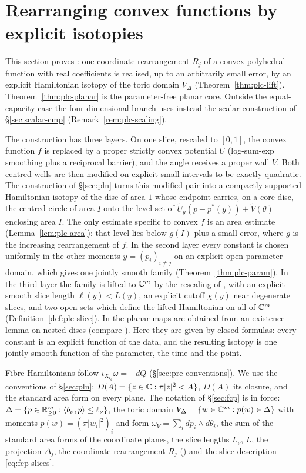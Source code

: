 \section{Rearranging convex functions by explicit isotopies}\label{sec:plc}

This section proves : one coordinate rearrangement $R_j$ of a convex
polyhedral function with real coefficients is realised, up to an arbitrarily small error, by an explicit Hamiltonian isotopy of the toric
domain $V_\Delta$ (Theorem~\ref{thm:plc-lift}). Theorem~\ref{thm:plc-planar} is the parameter-free planar core.
Outside the equal-capacity case the four-dimensional branch uses instead the scalar construction of
\S\ref{sec:scalar-cmp} (Remark~\ref{rem:plc-scaling}).

The construction has three layers. On one slice, rescaled to $[0,1]$, the convex function $f$ is replaced by a
proper strictly convex potential $U$ (log-sum-exp smoothing plus a reciprocal barrier), and the angle receives a
proper wall $V$. Both centred wells are then modified on explicit small intervals to be exactly quadratic. The construction of \S\ref{sec:pln} turns this modified pair into a compactly supported Hamiltonian
isotopy of the disc of area $1$ whose endpoint carries, on a core disc, the centred circle of area $I$ onto the level
set of $\widetilde U_y(p-p^*(y))+\widetilde V(\theta)$ enclosing area $I$. The only estimate specific to convex $f$ is an area estimate
(Lemma~\ref{lem:plc-area}): that level lies below $g(I)$ plus a small error, where $g$ is the increasing
rearrangement of $f$. In the second layer every constant is chosen uniformly in the other moments $y=(p_i)_{i\ne j}$
on an explicit open parameter domain, which gives one jointly smooth family (Theorem~\ref{thm:plc-param}). In the
third layer the family is lifted to $\mathbb{C}^m$ by the rescaling of \cite[\S2.3]{OpenAI2026}, with an explicit smooth
slice length $\ell(y)<L(y)$, an explicit cutoff $\chi(y)$ near degenerate slices, and two open sets which
define the lifted Hamiltonian on all of $\mathbb{C}^m$ (Definition~\ref{def:plc-slice}). In \cite[\S2.3]{OpenAI2026} the
planar maps are obtained from an existence lemma on nested discs (compare \cite[Lemma~3.2]{SchlenkFolding}). Here they are given by closed formulas: every
constant is an explicit function of the data, and the resulting isotopy is one jointly smooth function of the
parameter, the time and the point.

Fibre Hamiltonians follow $\iota_{X_Q}\omega=-dQ$ (\S\ref{sec:pre-conventions}). We use the conventions of
\S\ref{sec:pln}: $D(A)=\{z\in\mathbb{C}:\pi|z|^2<A\}$, $\bar D(A)$ its closure, and the standard area form on every plane.
The notation of \S\ref{sec:fcp} is in force: $\Delta=\{p\in\mathbb{R}^m_{\ge0}:\langle b_\nu,p\rangle\le\ell_\nu\}$, the toric
domain $V_\Delta=\{w\in\mathbb{C}^m:p(w)\in\Delta\}$ with moments $p(w)=(\pi|w_i|^2)_i$ and form
$\omega_V=\sum_idp_i\wedge d\theta_i$, the sum of the standard area forms of the coordinate planes, the slice lengths
$L_\nu$, $L$, the projection $\Delta_j$, the coordinate rearrangement $R_j$ ()
and the slice description \eqref{eq:fcp-slices}.

